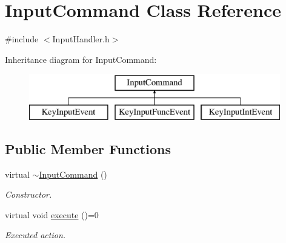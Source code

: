 \hypertarget{class_input_command}{\section{Input\+Command Class Reference}
\label{class_input_command}
}


{\ttfamily \#include $<$Input\+Handler.\+h$>$}

Inheritance diagram for Input\+Command\+:\begin{figure}[H]
\begin{center}
\leavevmode
\includegraphics[height=2.000000cm]{class_input_command}
\end{center}
\end{figure}
\subsection*{Public Member Functions}
\begin{DoxyCompactItemize}
\item 
\hypertarget{class_input_command_a203385c2bfacb53d17ac5749ee274dc0}{virtual \hyperlink{class_input_command_a203385c2bfacb53d17ac5749ee274dc0}{$\sim$\+Input\+Command} ()}\label{class_input_command_a203385c2bfacb53d17ac5749ee274dc0}

\begin{DoxyCompactList}\small\item\em Constructor. \end{DoxyCompactList}\item 
\hypertarget{class_input_command_a636f23300e444dcc55f7898971874a8f}{virtual void \hyperlink{class_input_command_a636f23300e444dcc55f7898971874a8f}{execute} ()=0}\label{class_input_command_a636f23300e444dcc55f7898971874a8f}

\begin{DoxyCompactList}\small\item\em Executed action. \end{DoxyCompactList}\end{DoxyCompactItemize}
